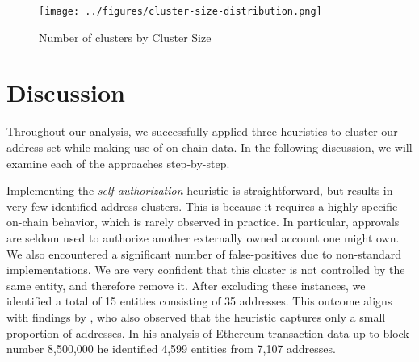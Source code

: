 \documentclass[12pt,a4paper,titlepage,oneside,english]{article}
\begin{document}
\begin{figure}[h]
	\centering
	\texttt{[image: ../figures/cluster-size-distribution.png]}
	\caption{Number of clusters by Cluster Size}
	\label{fig:barplot_clusters}
\end{figure}



\section{Discussion}


Throughout our analysis, we successfully applied three heuristics to cluster our address set while making use of on-chain data. In the following discussion, we will examine each of the approaches step-by-step.

Implementing the \textit{self-authorization} heuristic is straightforward, but results in very few identified address clusters. This is because it requires a highly specific on-chain behavior, which is rarely observed in practice. In particular, approvals are seldom used to authorize another externally owned account one might own. We also encountered a significant number of false-positives due to non-standard implementations. We are very confident that this cluster is not controlled by the same entity, and therefore remove it. After excluding these instances, we identified a total of 15 entities consisting of 35 addresses. This outcome aligns with findings by \cite{FV:17}, who also observed that the heuristic captures only a small proportion of addresses. In his analysis of Ethereum transaction data up to block number 8,500,000 he identified 4,599 entities from 7,107 addresses.
\end{document}
